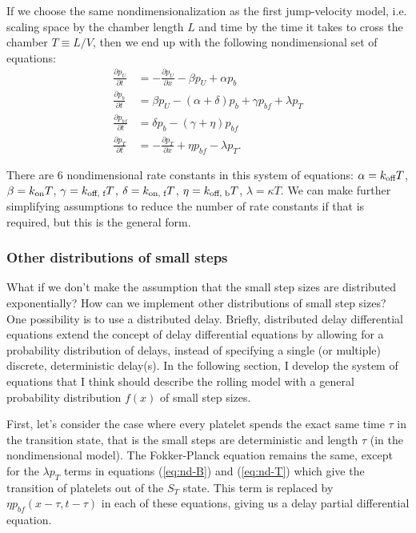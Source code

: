 \documentclass{article}
\newcommand{\tn}{\textnormal}
\newcommand{\Pder}[2]{\frac{\partial #1}{\partial #2}}
\begin{document}
If we choose the same nondimensionalization as the first jump-velocity
model, i.e. scaling space by the chamber length $L$ and time by the
time it takes to cross the chamber $T \equiv L/V$, then we end up with the
following nondimensional set of equations:
\begin{align}
  \Pder{p_U}{t} &= - \Pder{p_U}{x} - \beta p_U + \alpha
                  p_b \label{eq:nd-U} \\
  \Pder{p_b}{t} &= \beta p_U - (\alpha + \delta) p_b +
                  \gamma p_{bf} + \lambda p_T \label{eq:nd-B} \\
  \Pder{p_{bf}}{t} &= \delta p_b - (\gamma + \eta)
                     p_{bf} \label{eq:nd-BF} \\
  \Pder{p_T}{t} &= -\Pder{p_T}{x} + \eta p_{bf} - \lambda
                  p_T. \label{eq:nd-T}
\end{align}

There are 6 nondimensional rate constants in this system of equations:
$\alpha = k_\tn{off}T$, $\beta = k_\tn{on}T$, $\gamma = k_\tn{off,
  f}T$, $\delta = k_\tn{on, f}T$, $\eta = k_\tn{off, b} T$, $\lambda =
\kappa T$. We can make further simplifying assumptions to reduce the
number of rate constants if that is required, but this is the general
form.

\subsubsection{Other distributions of small steps}
\label{sec:other-distr-small}

What if we don't make the assumption that the small step sizes are
distributed exponentially? How can we implement other distributions of
small step sizes? One possibility is to use a distributed
delay. Briefly, distributed delay differential equations extend the
concept of delay differential equations by allowing for a probability
distribution of delays, instead of specifying a single (or multiple)
discrete, deterministic delay(s). In the following section, I develop
the system of equations that I think should describe the rolling model
with a general probability distribution $f(x)$ of small step sizes.

First, let's consider the case where every platelet spends the exact
same time $\tau$  in the transition state, that is the small steps are
deterministic and length $\tau$ (in the nondimensional model). The
Fokker-Planck equation remains the same, except for the $\lambda p_T$
terms in equations (\ref{eq:nd-B}) and (\ref{eq:nd-T}) which give the
transition of platelets out of the $S_T$ state. This term is replaced
by $\eta p_{bf}(x - \tau, t - \tau)$ in each of these equations, giving
us a delay partial differential equation.
\end{document}

